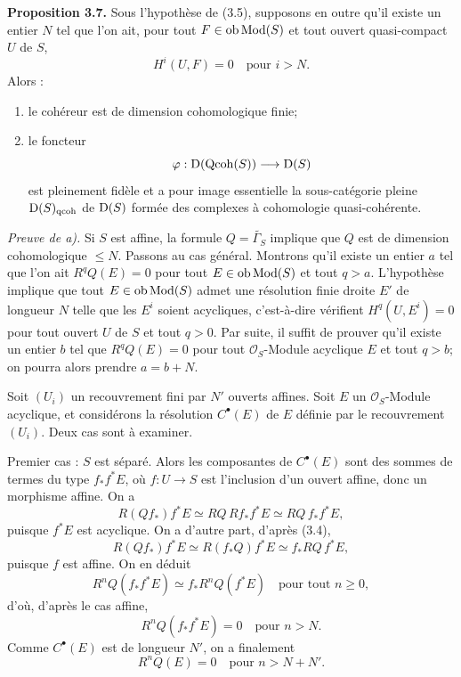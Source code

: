 \documentclass[11pt]{article}
\begin{document}
\textbf{Proposition 3.7.} Sous l'hypothèse de (3.5), supposons en outre qu'il existe un entier $N$ tel que l'on ait, pour tout $F\in\operatorname{ob}\operatorname{Mod}(S)$ et tout ouvert quasi-compact $U$ de $S$,
\[
H^i(U,F)=0\quad\text{pour }i>N.
\]
Alors :
\begin{enumerate}[label=\alph*)]
\item le cohéreur est de dimension cohomologique finie;
\item le foncteur
\[
\varphi:\mathrm D(\operatorname{Qcoh}(S))\longrightarrow\mathrm D(S)
\]
est pleinement fidèle et a pour image essentielle la sous-catégorie pleine $\mathrm D(S)_{\mathrm{qcoh}}$ de $\mathrm D(S)$ formée des complexes à cohomologie quasi-cohérente.
\end{enumerate}

\emph{Preuve de a).} Si $S$ est affine, la formule $Q=\widetilde{\Gamma_S}$ implique que $Q$ est de dimension cohomologique $\leq N$. Passons au cas général. Montrons qu'il existe un entier $a$ tel que l'on ait $R^qQ(E)=0$ pour tout $E\in\operatorname{ob}\operatorname{Mod}(S)$ et tout $q>a$. L'hypothèse implique que tout $E\in\operatorname{ob}\operatorname{Mod}(S)$ admet une résolution finie droite $E'$ de longueur $N$ telle que les $E^i$ soient acycliques, c'est-à-dire vérifient $H^q(U,E^i)=0$ pour tout ouvert $U$ de $S$ et tout $q>0$. Par suite, il suffit de prouver qu'il existe un entier $b$ tel que $R^qQ(E)=0$ pour tout $\mathcal O_S$-Module acyclique $E$ et tout $q>b$; on pourra alors prendre $a=b+N$.

Soit $(U_i)$ un recouvrement fini par $N'$ ouverts affines. Soit $E$ un $\mathcal O_S$-Module acyclique, et considérons la résolution $C^\bullet(E)$ de $E$ définie par le recouvrement $(U_i)$. Deux cas sont à examiner.

Premier cas : $S$ est séparé. Alors les composantes de $C^\bullet(E)$ sont des sommes de termes du type $f_*f^*E$, où $f:U\to S$ est l'inclusion d'un ouvert affine, donc un morphisme affine. On a
\[
R(Qf_*)f^*E\simeq RQ\,Rf_*f^*E\simeq RQ\,f_*f^*E,
\]
puisque $f^*E$ est acyclique. On a d'autre part, d'après (3.4),
\[
R(Qf_*)f^*E\simeq R(f_*Q)f^*E\simeq f_*RQ\,f^*E,
\]
puisque $f$ est affine. On en déduit
\[
R^nQ(f_*f^*E)\simeq f_*R^nQ(f^*E)\quad\text{pour tout }n\geq0,
\]
d'où, d'après le cas affine,
\[
R^nQ(f_*f^*E)=0\quad\text{pour }n>N.
\]
Comme $C^\bullet(E)$ est de longueur $N'$, on a finalement
\[
R^nQ(E)=0\quad\text{pour }n>N+N'.
\]
\end{document}
